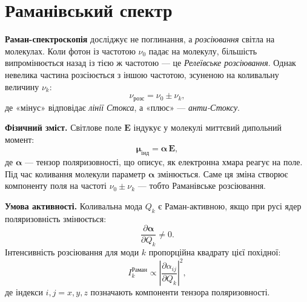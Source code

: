 \section{Раманівський спектр}

\textbf{Раман-спектроскопія} досліджує не поглинання, а \emph{розсіювання} світла на молекулах.
Коли фотон із частотою $\nu_0$ падає на молекулу, більшість випромінюється назад із тією ж частотою — це \emph{Релеївське розсіювання}.
Однак невелика частина розсіюється з іншою частотою, зсуненою на коливальну величину $\nu_k$:
\[
\nu_{\text{розс}} = \nu_0 \pm \nu_k,
\]
де «мінус» відповідає \emph{лінії Стокса}, а «плюс» — \emph{анти-Стоксу}.

\textbf{Фізичний зміст.}
Світлове поле $\mathbf{E}$ індукує у молекулі миттєвий дипольний момент:
\[
\boldsymbol{\mu}_{\text{інд}} = \boldsymbol{\alpha}\,\mathbf{E},
\]
де $\boldsymbol{\alpha}$ — тензор поляризовності, що описує, як електронна хмара реагує на поле.
Під час коливання молекули параметр $\boldsymbol{\alpha}$ змінюється.
Саме ця зміна створює компоненту поля на частоті $\nu_0 \pm \nu_k$ — тобто Раманівське розсіювання.

\textbf{Умова активності.}
Коливальна мода $Q_k$ є Раман-активною, якщо при русі ядер поляризовність змінюється:
\[
\frac{\partial \boldsymbol{\alpha}}{\partial Q_k} \neq 0.
\]
Інтенсивність розсіювання для моди $k$ пропорційна квадрату цієї похідної:
\[
I_k^{\text{Раман}} \propto
\left|
\frac{\partial \alpha_{ij}}{\partial Q_k}
\right|^2,
\]
де індекси $i,j=x,y,z$ позначають компоненти тензора поляризовності.


